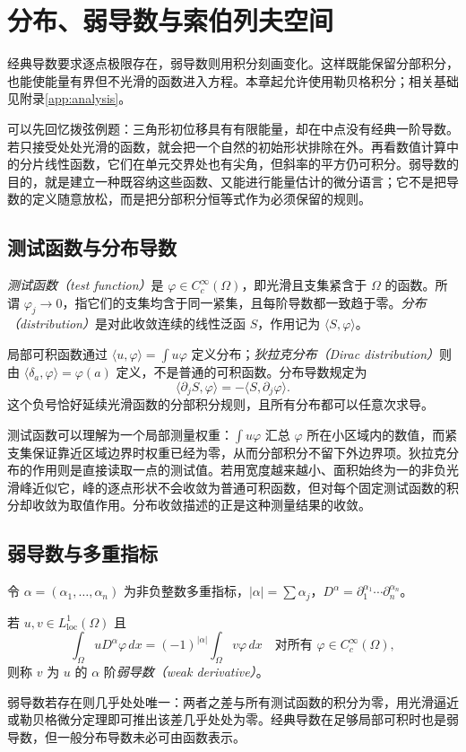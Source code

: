 \setcounter{chapter}{12} %
\chapter{分布、弱导数与索伯列夫空间}
\label{chap:sobolev}

经典导数要求逐点极限存在，弱导数则用积分刻画变化。这样既能保留分部积分，也能使能量有界但不光滑的函数进入方程。本章起允许使用勒贝格积分；相关基础见附录\ref{app:analysis}。

可以先回忆拨弦例题：三角形初位移具有有限能量，却在中点没有经典一阶导数。若只接受处处光滑的函数，就会把一个自然的初始形状排除在外。再看数值计算中的分片线性函数，它们在单元交界处也有尖角，但斜率的平方仍可积分。弱导数的目的，就是建立一种既容纳这些函数、又能进行能量估计的微分语言；它不是把导数的定义随意放松，而是把分部积分恒等式作为必须保留的规则。

\section{测试函数与分布导数}
\emph{测试函数（test function）}是 $\varphi\in C_c^\infty(\Omega)$，即光滑且支集紧含于 $\Omega$ 的函数。所谓 $\varphi_j\to0$，指它们的支集均含于同一紧集，且每阶导数都一致趋于零。\emph{分布（distribution）}是对此收敛连续的线性泛函 $S$，作用记为 $\langle S,\varphi\rangle$。

局部可积函数通过 $\langle u,\varphi\rangle=\int u\varphi$ 定义分布；\emph{狄拉克分布（Dirac distribution）}则由 $\langle\delta_a,\varphi\rangle=\varphi(a)$ 定义，不是普通的可积函数。分布导数规定为
\[
 \langle\partial_jS,\varphi\rangle=-\langle S,\partial_j\varphi\rangle.
\]
这个负号恰好延续光滑函数的分部积分规则，且所有分布都可以任意次求导。

测试函数可以理解为一个局部测量权重：$\int u\varphi$ 汇总 $\varphi$ 所在小区域内的数值，而紧支集保证靠近区域边界时权重已经为零，从而分部积分不留下外边界项。狄拉克分布的作用则是直接读取一点的测试值。若用宽度越来越小、面积始终为一的非负光滑峰近似它，峰的逐点形状不会收敛为普通可积函数，但对每个固定测试函数的积分却收敛为取值作用。分布收敛描述的正是这种测量结果的收敛。

\section{弱导数与多重指标}
令 $\alpha=(\alpha_1,\ldots,\alpha_n)$ 为非负整数多重指标，$|\alpha|=\sum\alpha_j$，$D^\alpha=\partial_1^{\alpha_1}\cdots\partial_n^{\alpha_n}$。
\begin{definition}
若 $u,v\in L^1_{\mathrm{loc}}(\Omega)$ 且
\begin{equation}
 \int_\Omega uD^\alpha\varphi\,dx=(-1)^{|\alpha|}\int_\Omega v\varphi\,dx
 \quad\text{对所有 }\varphi\in C_c^\infty(\Omega),
 \label{eq:weak-derivative}
\end{equation}
则称 $v$ 为 $u$ 的 $\alpha$ 阶\emph{弱导数（weak derivative）}。
\end{definition}
弱导数若存在则几乎处处唯一：两者之差与所有测试函数的积分为零，用光滑逼近或勒贝格微分定理即可推出该差几乎处处为零。经典导数在足够局部可积时也是弱导数，但一般分布导数未必可由函数表示。

